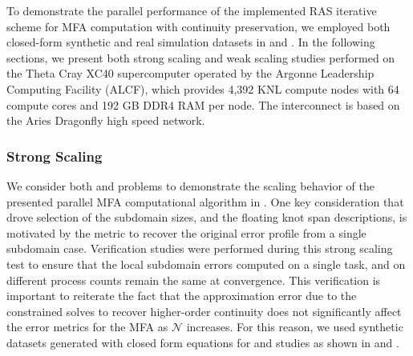 To demonstrate the parallel performance of the implemented RAS iterative scheme for MFA computation with continuity preservation, we employed both closed-form synthetic and real simulation datasets in  and . In the following sections, we present both strong scaling and weak scaling studies performed on the Theta Cray XC40 supercomputer operated by the Argonne Leadership Computing Facility (ALCF), which provides 4,392 KNL compute nodes with 64 compute cores and 192 GB DDR4 RAM per node. The interconnect is based on the Aries Dragonfly high speed network.

\subsubsection*{Strong Scaling}

We consider both  and  problems to demonstrate the scaling behavior of the presented parallel MFA computational algorithm in . One key consideration that drove selection of the subdomain sizes, and the floating knot span descriptions, is motivated by the metric to recover the original error profile from a single subdomain case. 
Verification studies were performed during this strong scaling test to ensure that the local subdomain errors computed on a single task, and on different process counts remain the same at convergence. This verification is important to reiterate the fact that the approximation error due to the constrained solves to recover higher-order continuity does not significantly affect the error metrics for the MFA as $\mathcal{N}$ increases. For this reason, we used synthetic datasets generated with closed form equations for  and  studies as shown in  and .


